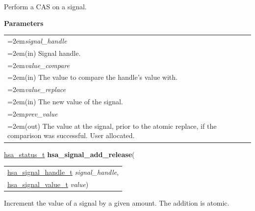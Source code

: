 \documentclass[final]{book}
\newcommand{\hsaarg}[1]{\textit{#1}}
\begin{document}
\begin{appendices}
\begin{tcolorbox}[breakable,nobeforeafter,colframe=white,colback=lightgray,left=0mm]
\end{tcolorbox}
Perform a CAS on a signal.

\noindent\textbf{Parameters}\\[-6mm]
\noindent\begin{longtable}{@{}>{\hangindent=2em}p{\textwidth}}
\hsaarg{signal_handle}\\\hspace{2em}(in) Signal handle.\\[2mm]
\hsaarg{value_compare}\\\hspace{2em}(in) The value to compare the handle's value with.\\[2mm]
\hsaarg{value_replace}\\\hspace{2em}(in) The new value of the signal.\\[2mm]
\hsaarg{prev_value}\\\hspace{2em}(out) The value at the signal, prior to the atomic replace, if the comparison was successful. User allocated.
\end{longtable}
 


\noindent\begin{tcolorbox}[breakable,nobeforeafter,colframe=white,colback=lightgray,left=0mm]
\hyperlink{group--status-1gad755322e7ff95456520e8abdbe90d225}{hsa_status_t} \hypertarget{group--signals-1ga1046b9448873e8e40f6ecc6805595e3e}{\textbf{hsa_signal_add_release}}(
\vspace{-3.5mm}\begin{longtable}{@{}p{\textwidth}}
\hspace{1.7em}\hyperlink{group--signals-1ga6592c136d70853d855bc11d9efdbf534}{hsa_signal_handle_t} \hsaarg{signal_handle},\\
\hspace{1.7em}\hyperlink{group--signals-1gafbee4e541abad1c32592796808a7fdb6}{hsa_signal_value_t} \hsaarg{value})\end{longtable}

\end{tcolorbox}
Increment the value of a signal by a given amount. The addition is atomic.


\end{appendices}
\end{document}

